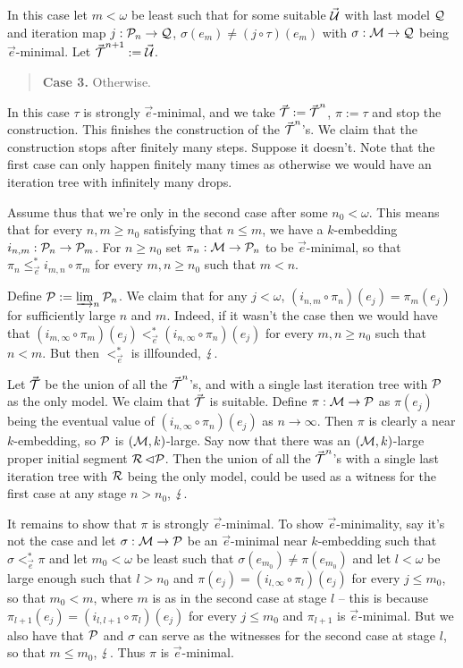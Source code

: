 {In this case let $m<\omega$ be least such that for some suitable $\vec\U$ with last model $\Q$ and iteration map $j:\P_n\to\Q$, $\sigma(e_m)\neq (j\circ\tau)(e_m)$ with $\sigma:\M\to\Q$ being $\vec e$-minimal. Let $\vec\T^{n+1}:=\vec\U$.

\begin{quote}
\textbf{Case 3.} Otherwise.
\end{quote}

In this case $\tau$ is strongly $\vec e$-minimal, and we take $\vec\T:=\vec\T^n$, $\pi:=\tau$ and stop the construction. This finishes the construction of the $\vec\T^n$'s. We claim that the construction stops after finitely many steps. Suppose it doesn't. Note that the first case can only happen finitely many times as otherwise we would have an iteration tree with infinitely many drops.

\qquad Assume thus that we're only in the second case after some $n_0<\omega$. This means that for every $n,m\geq n_0$ satisfying that $n\leq m$, we have a $k$-embedding $i_{n,m}:\P_n\to\P_m$. For $n\geq n_0$ set $\pi_n:\M\to\P_n$ to be $\vec e$-minimal, so that $\pi_n\leq_{\vec e}^* i_{m,n}\circ\pi_m$ for every $m,n\geq n_0$ such that $m<n$.

\qquad Define $\P:=\colimm_n\P_n$. We claim that for any $j<\omega$, $(i_{n,m}\circ\pi_n)(e_j)=\pi_m(e_j)$ for sufficiently large $n$ and $m$. Indeed, if it wasn't the case then we would have that $(i_{m,\infty}\circ\pi_m)(e_j)<_{\vec e}^* (i_{n,\infty}\circ\pi_n)(e_j)$ for every $m,n\geq n_0$ such that $n<m$. But then $<_{\vec e}^*$ is illfounded, $\contr$.

\qquad Let $\vec\T$ be the union of all the $\vec\T^n$'s, and with a single last iteration tree with $\P$ as the only model. We claim that $\vec\T$ is suitable. Define $\pi:\M\to\P$ as $\pi(e_j)$ being the eventual value of $(i_{n,\infty}\circ\pi_n)(e_j)$ as $n\to\infty$. Then $\pi$ is clearly a near $k$-embedding, so $\P$ is $(\M,k)$-large. Say now that there was an $(\M,k)$-large proper initial segment $\R\pinit\P$. Then the union of all the $\vec\T^n$'s with a single last iteration tree with $\R$ being the only model, could be used as a witness for the first case at any stage $n>n_0$, $\contr$.

\qquad It remains to show that $\pi$ is strongly $\vec e$-minimal. To show $\vec e$-minimality, say it's not the case and let $\sigma:\M\to\P$ be an $\vec e$-minimal near $k$-embedding such that $\sigma<_{\vec e}^*\pi$ and let $m_0<\omega$ be least such that $\sigma(e_{m_0})\neq\pi(e_{m_0})$ and let $l<\omega$ be large enough such that $l>n_0$ and $\pi(e_j)=(i_{l,\infty}\circ\pi_l)(e_j)$ for every $j\leq m_0$, so that $m_0<m$, where $m$ is as in the second case at stage $l$ -- this is because $\pi_{l+1}(e_j)=(i_{l,l+1}\circ\pi_l)(e_j)$ for every $j\leq m_0$ and $\pi_{l+1}$ is $\vec e$-minimal. But we also have that $\P$ and $\sigma$ can serve as the witnesses for the second case at stage $l$, so that $m\leq m_0$, $\contr$. Thus $\pi$ is $\vec e$-minimal.

}

